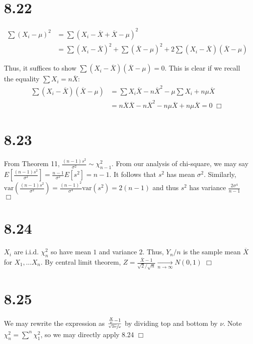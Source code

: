 \documentclass{article}
\newcommand{\var}{\mathrm{var}}
\begin{document}
\section*{8.22}
\begin{equation*}
\begin{split}
  \sum(X_i - \mu)^2 &= \sum(X_i - \overline{X} + \overline{X} - \mu)^2\\
  &= \sum(X_i - \overline{X})^2 + \sum(\overline{X}-\mu)^2 + 2\sum(X_i - \overline{X})(\overline{X}-\mu)
\end{split}
\end{equation*}

Thus, it suffices to show $\sum(X_i - \overline{X})(\overline{X}-\mu) = 0$. This is clear if we recall the equality $\sum X_i = n\overline{X}$:
\begin{equation*}
\begin{split}
  \sum(X_i - \overline{X})(\overline{X}-\mu) &= \sum X_i \overline{X} - n\overline{X}^2 - \mu \sum X_i + n\mu\overline{X}\\
  &= n\overline{X}\overline{X} - n\overline{X}^2 - n\mu\overline{X} + n\mu\overline{X} = 0 \; \Box
\end{split}
\end{equation*}

\section*{8.23}
From Theorem 11, $\frac{(n-1)s^2}{\sigma^2} \sim \chi^2_{n-1}$. From our analysis of chi-square, we may say $E[\frac{(n-1)s^2}{\sigma^2}] = \frac{n-1}{\sigma^2}E[s^2] = n-1$. It follows that $s^2$ has mean $\sigma^2$. Similarly, $\var(\frac{(n-1)s^2}{\sigma^2}) = \frac{(n-1)^2}{\sigma^4}\var(s^2) = 2(n-1)$ and thus $s^2$ has variance $\frac{2\sigma^4}{n-1}$ $\Box$

\section*{8.24}
$X_i$ are i.i.d. $\chi^2_n$ so have mean $1$ and variance $2$. Thus, $Y_n/n$ is the sample mean $\overline{X}$ for $X_1, \dots X_n$. By central limit theorem, $Z = \frac{\overline{X} - 1}{\sqrt{2}/\sqrt{n}} \xrightarrow[n \rightarrow \infty]{} N(0,1)$ $\Box$

\section*{8.25}
We may rewrite the expression as $\frac{\frac{X}{\nu} - 1}{{\sfrac{\sqrt{2\nu}}{\nu}}}$ by dividing top and bottom by $\nu$. Note $\chi^2_n = \sum\limits^n \chi^2_1$, so we may directly apply 8.24 $\Box$
\end{document}
